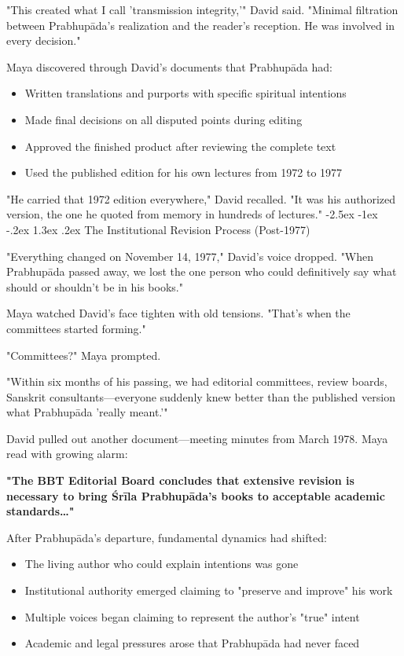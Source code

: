 \documentclass[12pt,twoside]{book}
\makeatletter
\renewcommand\section{\@startsection{section}{1}{\z@}%
{-2.5ex \@plus -1ex \@minus -.2ex}%
{1.3ex \@plus.2ex}%
{\normalfont\Large\bfseries}}
\makeatother
\begin{document}
"This created what I call 'transmission integrity,'" David said. "Minimal filtration between Prabhupāda's realization and the reader's reception. He was involved in every decision."

Maya discovered through David's documents that Prabhupāda had:
\begin{itemize}
\item Written translations and purports with specific spiritual intentions
\item Made final decisions on all disputed points during editing
\item Approved the finished product after reviewing the complete text
\item Used the published edition for his own lectures from 1972 to 1977
\end{itemize}

"He carried that 1972 edition everywhere," David recalled. "It was his authorized version, the one he quoted from memory in hundreds of lectures."
\section{The Institutional Revision Process (Post-1977)}
\label{sec:org3046f8e}

"Everything changed on November 14, 1977," David's voice dropped. "When Prabhupāda passed away, we lost the one person who could definitively say what should or shouldn't be in his books."

Maya watched David's face tighten with old tensions. "That's when the committees started forming."

"Committees?" Maya prompted.

"Within six months of his passing, we had editorial committees, review boards, Sanskrit consultants—everyone suddenly knew better than the published version what Prabhupāda 'really meant.'"

David pulled out another document—meeting minutes from March 1978. Maya read with growing alarm:

\textbf{"The BBT Editorial Board concludes that extensive revision is necessary to bring Śrīla Prabhupāda's books to acceptable academic standards\ldots{}"}

After Prabhupāda's departure, fundamental dynamics had shifted:
\begin{itemize}
\item The living author who could explain intentions was gone
\item Institutional authority emerged claiming to "preserve and improve" his work
\item Multiple voices began claiming to represent the author's "true" intent
\item Academic and legal pressures arose that Prabhupāda had never faced
\end{itemize}
\end{document}
